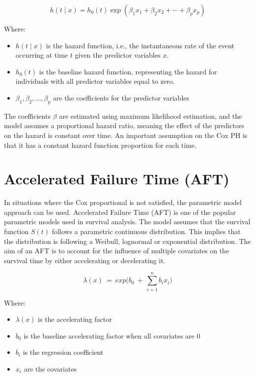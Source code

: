 \documentclass[doublespacing]{report} %
\begin{document}
\[
h\left(t \mid x\right) = h_0(t) \exp(\beta_1 x_1 + \beta_2 x_2 + \cdots + \beta_p x_p)
\]

Where:
 \begin{itemize}
     \item \(h(t\mid x)\) is the hazard function, i.e., the instantaneous rate of the event occurring at time \(t\) given the predictor variables \(x\).
     \item \(h_0\left(t\right)\) is the baseline hazard function, representing the hazard for individuals with all predictor variables equal to zero.
     \item \(\beta_1,\beta_2,\ldots,\beta_p\) are the coefficients for the predictor variables
 \end{itemize}

 The coefficients \(\beta\) are estimated using maximum likelihood estimation, and the model assumes a proportional hazard ratio, meaning the effect of the predictors on the hazard is constant over time.
An important assumption on the Cox PH is that it has a constant hazard function proportion for each time.


%
%


\section{Accelerated Failure Time (AFT)}

In situations where the Cox proportional is not satisfied, the parametric model approach can be used. Accelerated Failure Time (AFT) is one of the popular parametric models used in survival analysis. The model assumes that the survival function \(S(t)\) follows a parametric continuous distribution. This implies that the distribution is following a Weibull, lognormal or exponential distribution. The aim of an AFT is to account for the influence of multiple covariates on the survival time by either accelerating or decelerating it.

\[\lambda(x)\ =\ exp(b_0\ +\ \sum_{i=1}^{n}{b_ix_i)}\]

Where:
 \begin{itemize}
     \item \(\lambda(x)\) is the accelerating factor
     \item \(b_0 \) is the baseline accelerating factor when all covariates are 0
     \item \(b_i\) is the regression coefficient
     \item \(x_i\) are the covariates

 \end{itemize}
 
\end{document}
